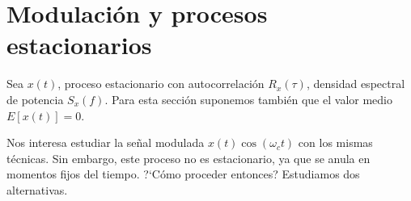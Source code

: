 \section{Modulación y procesos estacionarios}\label{sec.modest}

Sea $x(t)$, proceso estacionario con autocorrelación $R_x(\tau)$,
densidad espectral de potencia $S_x(f)$. Para esta sección suponemos también que
el valor medio $E[x(t)]=0$.

Nos interesa estudiar la
señal modulada $x(t)\cos(\omega_ct)$ con los mismas técnicas. Sin
embargo, este proceso no es estacionario, ya que se anula en
momentos fijos del tiempo. ?`Cómo proceder entonces?
Estudiamos dos alternativas.

